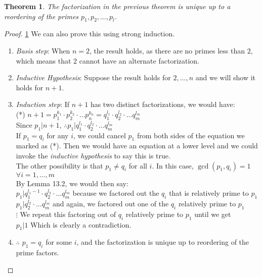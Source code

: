 \documentclass[10pt]{article}
\newtheorem{theorem}{Theorem}
\theoremstyle{definition}
\theoremstyle{remark}
\begin{document}
\begin{theorem}\label{The Fundamental Theorem of Arithmetic}
The factorization in the previous theorem is unique up to a reordering of the primes $p_1,p_2,\ldots,p_l$.
\end{theorem}
\begin{proof}\ref{The Fundamental Theorem of Arithmetic}
We can also prove this using strong induction.  
\begin{enumerate}
\item \textit{Basis step}: When $n = 2$, the result holds, as there are no primes less than 2, which means that 2 cannot have an alternate factorization.
\item \textit{Inductive Hypothesis}: Suppose the result holds for $2,\ldots,n$ and we will show it holds for $n + 1$.
\item \textit{Induction step}: If $n+1$ has two distinct factorizations, we would have:\\
(*) $n + 1 = p^{k_1}_1 \cdot p^{k_2}_2 \cdot \ldots p^{k_n}_n = q^{l_1}_1 \cdot q^{l_2}_2 \cdot \ldots q^{l_m}_m$\\
Since $p_1|n+1$, $\therefore p_1|q^{l_1}_1 \cdot q^{l_2}_2 \cdot \ldots q^{l_m}_m$\\
If $p_1 = q_i$ for any $i$, we could cancel $p_1$ from both sides of the equation we marked as (*).  Then we would have an equation at a lower level and we could invoke the \textit{inductive hypothesis} to say this is true.\\
The other possibility is that $p_1 \neq q_i$ for all $i$.  In this case, $\gcd(p_1,q_i) = 1$  $\forall i = 1,\ldots,m$\\
By Lemma 13.2, we would then say:\\
$p_1|q^{l_1-1}_1 \cdot q^{l_2}_2 \cdot \ldots q^{l_m}_m$ because we factored out the $q_i$ that is relatively prime to $p_1$\\
$p_1|q^{l_2}_2 \cdot \ldots q^{l_m}_m$ and again, we factored out one of the $q_i$ relatively prime to $p_1$\\
$\vdots$ We repeat this factoring out of $q_i$ relatively prime to $p_1$ until we get\\
$p_1|1$ Which is clearly a contradiction.\\
\item $\therefore$ $p_1 = q_i$ for some $i$, and the factorization is unique up to reordering of the prime factors.
\end{enumerate}
\end{proof}
\end{document}
